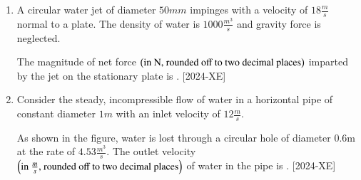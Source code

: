 \documentclass[journal]{IEEEtran}
\begin{document}
\begin{enumerate}[start=27]
\item A circular water jet of diameter $50 mm$ impinges with a velocity of $18 \frac{m}{s}$ normal to a plate. The density of water is $1000 \frac{m^3}{s}$ and gravity force is neglected.
\begin{figure}[H]
    \centering
    
    \label{38}
\end{figure}
The magnitude of net force $\left(\text{in N, rounded off to two decimal places}\right)$ imparted by the jet on the stationary plate is \underline{\hspace{1cm}}. \hfill{[2024-XE]}\\

\item Consider the steady, incompressible flow of water in a horizontal pipe of constant diameter $1 m$ with an inlet velocity of $12 \frac{m}{s}$.
\begin{figure}[H]
    \centering
    
    \label{39}
\end{figure}
As shown in the figure, water is lost through a circular hole of diameter $0.6  \text{m}$ at the rate of $4.53 \frac{m^3}{s}$. The outlet velocity $\left(\text{in } \frac{m}{s} \text{, rounded off to two decimal places}\right)$ of water in the pipe is \underline{\hspace{1cm}}. \hfill{[2024-XE]}\\

\end{enumerate}
\end{document}
